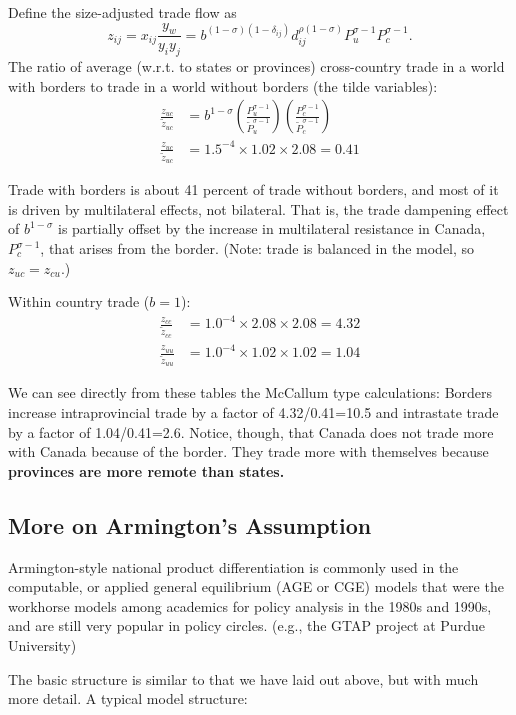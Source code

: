 \documentclass[11pt, pdftex]{article}
\newcommand{\sig}{\sigma}
\begin{document}
Define the size-adjusted trade flow as
\begin{equation}
z_{ij}=x_{ij}\frac{y_w}{y_iy_j}=b^{(1-\sig)(1-\delta_{ij})} d_{ij}^{\rho(1-\sigma)} P_u^{\sig-1} P_c^{\sig-1}.
\end{equation}
The ratio of average (w.r.t. to states or provinces) cross-country trade in a world with borders to trade in a world without borders (the tilde variables):
\begin{align}
\frac{z_{uc}}{\tilde{z}_{uc}}&=b^{1-\sig} \left(\frac{P_u^{\sig-1}}{\tilde{P}_u^{\sig-1}}\right) \left(\frac{P_c^{\sig-1}}{\tilde{P}_c^{\sig-1}}\right)\\
\frac{z_{uc}}{\tilde{z}_{uc}}&=1.5^{-4}\times1.02\times2.08=0.41
\end{align}

Trade with borders is about 41 percent of trade without borders, and most of it is driven by multilateral effects, not bilateral.  That is, the trade dampening effect of $b^{1-\sigma}$ is partially offset by the increase in multilateral resistance in Canada, $P_c^{\sigma-1}$, that arises from the border. (Note: trade is balanced in the model, so $z_{uc}=z_{cu}$.)

Within country trade ($b=1$):
\begin{align}
\frac{z_{cc}}{\tilde{z}_{cc}}&=1.0^{-4}\times2.08\times2.08=4.32\\
\frac{z_{uu}}{\tilde{z}_{uu}}&=1.0^{-4}\times1.02\times1.02=1.04
\end{align}

We can see directly from these tables the McCallum type calculations:
Borders increase intraprovincial trade by a factor of 4.32/0.41=10.5 and intrastate trade by a factor of 1.04/0.41=2.6. Notice, though, that Canada does not trade more with Canada because of the border. They trade more with themselves because \textbf{provinces are more remote than states.}

\subsection*{More on Armington's Assumption}
Armington-style national product differentiation is commonly used in the computable, or applied general equilibrium (AGE or CGE) models that were the workhorse models among academics for policy analysis in the 1980s and 1990s, and are still very popular in policy circles. (e.g., the GTAP project at Purdue University)

The basic structure is similar to that we have laid out above, but with much more detail.  A typical model structure:
\end{document}
